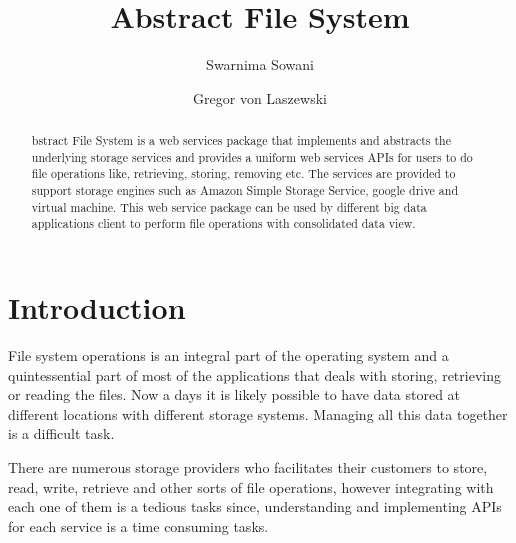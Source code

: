
\title{Abstract File System}


\author{Swarnima Sowani}

\author{Gregor von Laszewski}


\renewcommand{\shortauthors}{G. v. Laszewski}


\begin{abstract}
bstract File System is a web services package that implements and abstracts
the underlying storage services and provides a uniform web services APIs for
users to do file operations like, retrieving, storing, removing  etc. The
services are provided to support storage engines such as Amazon Simple Storage
Service, google drive and virtual machine. This web service package can be
used by different big data applications client to perform file operations with
consolidated data view. 


\end{abstract}



\maketitle

\section{Introduction}


File system operations is an integral part of the operating system and a
quintessential part of most of the applications that deals with storing,
retrieving or reading the files. Now a days it is likely possible to have data
stored at different locations with different storage systems. Managing all this
data together is a difficult task.

There are numerous storage providers who facilitates their customers to store,
read, write, retrieve and other sorts of file operations, however integrating
with each one of them is a tedious tasks since, understanding and implementing
APIs for each service is a time consuming tasks.


